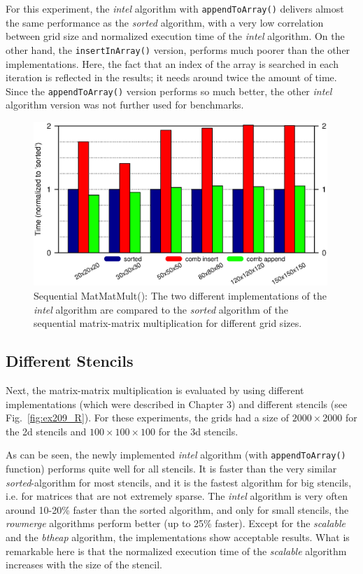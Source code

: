 For this experiment, the \textit{intel} algorithm with \texttt{appendToArray()} delivers almost the same performance as the \textit{sorted} algorithm, with a very low correlation between grid size and normalized execution time of the \textit{intel} algorithm. On the other hand, the \texttt{insertInArray()} version, performs much poorer than the other implementations. Here, the fact that an index of the array is searched in each iteration is reflected in the results; it needs around twice the amount of time. Since the \texttt{appendToArray()} version performs so much better, the other \textit{intel} algorithm version was not further used for benchmarks.

\begin{figure}[tb]
	\centering
	\includegraphics[width=0.99\textwidth, trim={0 2.cm 0 7cm},clip]{seq_insert_append}
	\caption{Sequential MatMatMult(): The two different implementations of the \textit{intel} algorithm are compared to the \textit{sorted} algorithm of the sequential matrix-matrix multiplication for different grid sizes.} 
	\label{fig:ex209_insert_append_3d19p}
\end{figure}

\subsection{Different Stencils}
Next, the matrix-matrix multiplication is evaluated by using different implementations (which were described in Chapter 3) and different stencils (see Fig.~\ref{fig:ex209_R}). For these experiments, the grids had a size of $2000 \times 2000$ for the 2d stencils and $100\times 100 \times 100$ for the 3d stencils. 

As can be seen, the newly implemented \textit{intel} algorithm (with \texttt{appendToArray()} function) performs quite well for all stencils. It is faster than the very similar \textit{sorted}-algorithm for most stencils, and it is the fastest algorithm for big stencils, i.e. for matrices that are not extremely sparse. The \textit{intel} algorithm is very often around 10-20\% faster than the sorted algorithm, and only for small stencils, the \textit{rowmerge} algorithms perform better (up to 25\% faster). Except for the \textit{scalable} and the \textit{btheap} algorithm, the implementations show acceptable results. What is remarkable here is that the normalized execution time of the \textit{scalable} algorithm increases with the size of the stencil.%

